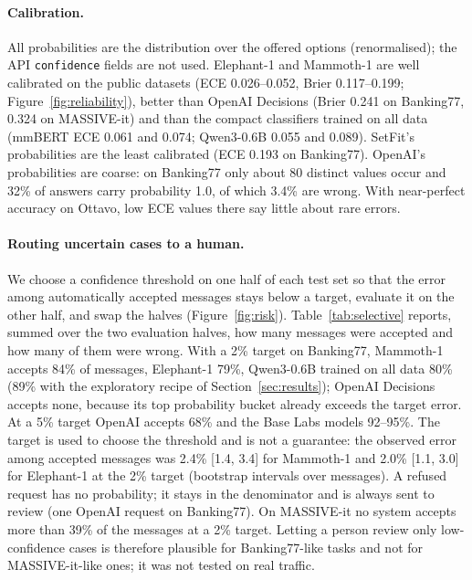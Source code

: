 \paragraph{Calibration.} All probabilities are the distribution over the offered options (renormalised); the API
\texttt{confidence} fields are not used. Elephant-1 and Mammoth-1 are well calibrated on the public datasets
(ECE 0.026--0.052, Brier 0.117--0.199; Figure~\ref{fig:reliability}), better than OpenAI Decisions (Brier 0.241 on Banking77, 0.324 on MASSIVE-it) and than the
compact classifiers trained on all data (mmBERT ECE 0.061 and 0.074; Qwen3-0.6B 0.055 and 0.089). SetFit's probabilities are the
least calibrated (ECE 0.193 on Banking77). OpenAI's probabilities are coarse: on Banking77 only about 80 distinct values occur and
32\% of answers carry probability 1.0, of which 3.4\% are wrong. With near-perfect accuracy on Ottavo, low ECE values there say
little about rare errors.

\paragraph{Routing uncertain cases to a human.} We choose a confidence threshold on one half of each test set so that the error
among automatically accepted messages stays below a target, evaluate it on the other half, and swap the halves
(Figure~\ref{fig:risk}). Table~\ref{tab:selective} reports, summed over the two evaluation halves, how many messages were accepted and
how many of them were wrong. With a 2\% target on Banking77, Mammoth-1 accepts 84\% of messages, Elephant-1 79\%, Qwen3-0.6B
trained on all data 80\% (89\% with the exploratory recipe of Section~\ref{sec:results}); OpenAI Decisions accepts none, because its
top probability bucket already exceeds the target error. At a 5\% target OpenAI accepts 68\% and the Base Labs models 92--95\%. The
target is used to choose the threshold and is not a guarantee: the observed error among accepted messages was 2.4\% [1.4, 3.4] for
Mammoth-1 and 2.0\% [1.1, 3.0] for Elephant-1 at the 2\% target (bootstrap intervals over messages). A refused request has no
probability; it stays in the denominator and is always sent to review (one OpenAI request on Banking77). On MASSIVE-it no system accepts more than 39\% of
the messages at a 2\% target. Letting a person review only low-confidence cases is therefore plausible for Banking77-like tasks and not
for MASSIVE-it-like ones; it was not tested on real traffic.

